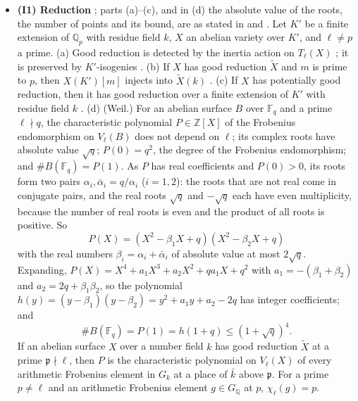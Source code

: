 \documentclass[11pt]{article}
\newcommand{\Q}{\mathbb Q}
\newcommand{\Z}{\mathbb Z}
\newcommand{\F}{\mathbb F}
\begin{document}
\begin{itemize}
\item \textbf{(I1) Reduction} \cite{ST}; parts (a)--(c), and in (d) the absolute value of the roots, the number of
points and its bound, are as stated in \cite[(I2)]{P612} and \cite[(I1)]{P2210}. Let \(K'\) be a
finite extension of \(\Q_p\) with residue field \(k\), \(X\) an abelian variety over \(K'\), and \(\ell\neq p\) a
prime. (a) Good reduction is detected by the inertia action on \(T_\ell(X)\) \cite[\S1, Theorem~1]{ST}; it is
preserved by \(K'\)-isogenies \cite[\S1, Corollary~2]{ST}. (b) If \(X\) has good reduction \(\widetilde X\) and
\(m\) is prime to \(p\), then \(X(K')[m]\) injects into \(\widetilde X(k)\) \cite[Lemma~2]{ST}. (c) If \(X\) has
potentially good reduction, then it has good reduction over a finite extension of \(K'\) with residue field \(k\)
\cite[\S2]{ST}. (d) (Weil.) For an abelian surface \(B\) over \(\F_q\) and a prime \(\ell\nmid q\), the
characteristic polynomial \(P\in\Z[X]\) of the Frobenius endomorphism on \(V_\ell(B)\) does not depend on
\(\ell\); its complex roots have absolute value \(\sqrt q\); \(P(0)=q^2\), the degree of the Frobenius
endomorphism; and \(\#B(\F_q)=P(1)\). As \(P\) has real coefficients and \(P(0)>0\), its roots form two pairs
\(\alpha_i,\bar\alpha_i=q/\alpha_i\) (\(i=1,2\)): the roots that are not real come in conjugate pairs, and the
real roots \(\sqrt q\) and \(-\sqrt q\) each have even multiplicity, because the number of real roots is even and
the product of all roots is positive. So
\[P(X)=(X^2-\beta_1X+q)(X^2-\beta_2X+q)\]
with the real numbers \(\beta_i=\alpha_i+\bar\alpha_i\) of absolute value at most \(2\sqrt q\). Expanding,
\(P(X)=X^4+a_1X^3+a_2X^2+qa_1X+q^2\) with \(a_1=-(\beta_1+\beta_2)\) and \(a_2=2q+\beta_1\beta_2\), so the
polynomial \(h(y)=(y-\beta_1)(y-\beta_2)=y^2+a_1y+a_2-2q\) has integer coefficients; and
\[\#B(\F_q)=P(1)=h(1+q)\le(1+\sqrt q)^4.\]
If an abelian surface \(X\) over a number field \(k\) has good reduction \(\widetilde X\) at a prime
\(\mathfrak p\nmid\ell\), then \(P\) is the characteristic polynomial on \(V_\ell(X)\) of every arithmetic
Frobenius element in \(G_k\) at a place of \(\bar k\) above \(\mathfrak p\). For a prime \(p\neq\ell\) and an arithmetic
Frobenius element \(g\in G_{\Q}\) at \(p\), \(\chi_\ell(g)=p\).


\end{itemize}
\end{document}
